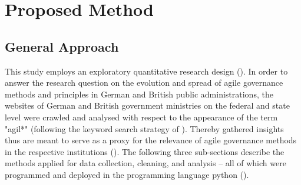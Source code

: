 








\section{Proposed Method}
\subsection{General Approach}
This study employs an exploratory quantitative research design (\cite{Olston2010, Jaeger1998}). In order to answer the research question on the evolution and spread of agile governance methods and principles in German and British public administrations, the websites of German and British government ministries on the federal and state level were crawled and analysed with respect to the appearance of the term "agil*" (following the keyword search strategy of \cite{Mergel2018}). Thereby gathered insights thus are meant to serve as a proxy for the relevance of agile governance methods in the respective institutions (\cite{Branco2006, Ghosh2013}). The following three sub-sections describe the methods applied for data collection, cleaning, and analysis – all of which were programmed and deployed in the programming language python (\cite{VanRossum1995}).
%
